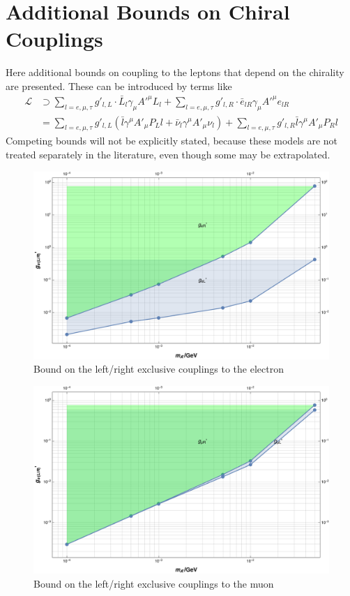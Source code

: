 \chapter{Additional Bounds on Chiral Couplings}
Here additional bounds on coupling to the leptons that depend on the chirality are presented. These can be introduced by terms like
\begin{align}
\mathcal{L} &\supset \sum_{l=e,\mu,\tau}g'_{l,L}\cdot\bar{L}_l\gamma_\mu A'^\mu L_l+\sum_{l=e,\mu,\tau}g'_{l,R}\cdot\bar{e}_{lR}\gamma_\mu A'^\mu e_{lR}\\
&=\sum_{l=e,\mu,\tau} g'_{l,L}\left(\bar{l}\gamma^\mu A'_\mu P_L l+\bar{\nu}_l\gamma^\mu A'_\mu \nu_l\right)+\sum_{l=e,\mu,\tau} g'_{l,R}\bar{l}\gamma^\mu A'_\mu P_R l
\end{align}
Competing bounds will not be explicitly stated, because these models are not treated separately in the literature, even though some may be extrapolated. 
\begin{figure}[H]
  \centering
    \includegraphics[width=\textwidth]{imgs/BoundERL}
    \caption{Bound on the left/right exclusive couplings to the electron}
    \label{fg:ERLBound}
\end{figure}
\begin{figure}[H]
  \centering
    \includegraphics[width=\textwidth]{imgs/BoundMRL}
    \caption{Bound on the left/right exclusive couplings to the muon}
    \label{fg:MRLBound}
\end{figure}